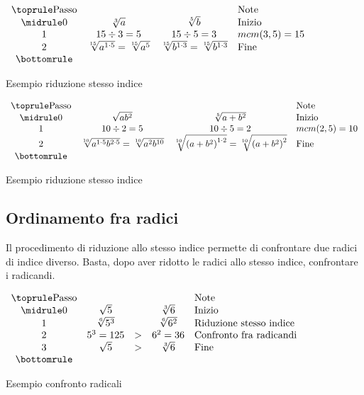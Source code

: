 \begin{table}[H]
\centering
$
\begin{array}{cccl}
\toprule
\text{Passo} &  &  & \text{Note} \\  
\midrule
0 & \sqrt[3]{a} &\sqrt[5]{b}  &\text{Inizio} \\ 
1 & 15\div 3=5 &15\div 5=3  & mcm(3,5)=15 \\  
2 &\sqrt[15]{a^{1\cdot5}}=\sqrt[15]{a^{5}}  &\sqrt[15]{b^{1\cdot3}}=\sqrt[15]{b^{1\cdot3}}  &\text{Fine} \\
\bottomrule	
\end{array} 
$
\label{tab:Es1Ridstessoindice}
\caption{Esempio riduzione stesso indice}
\end{table}
\begin{table}[H]
\centering
$
\begin{array}{cccl}
\toprule
\text{Passo} &  &  &\text{Note} \\  
\midrule
0 & \sqrt{ab^2} &\sqrt[5]{a+b^2}  &\text{Inizio} \\ 
1 & 10\div 2=5 &10\div 5=2  & mcm(2,5)=10 \\  
2 &\sqrt[10]{a^{1\cdot 5}b^{2\cdot 5}}=\sqrt[10]{a^{2}b^{10}}& \sqrt[10]{\left( a+b^2\right)^{1\cdot 2} }=\sqrt[10]{\left( a+b^2\right)^{2} }   &\text{Fine} \\
\bottomrule	
\end{array} 
$
\label{tab:Es1Ridstessoindice2}
\caption{Esempio riduzione stesso indice}
\end{table}
\subsection{Ordinamento fra radici}
\label{sec:OrdinamentoFraRadici}
Il procedimento di riduzione allo stesso indice permette di confrontare due radici di indice diverso. Basta, dopo aver ridotto le radici allo stesso indice, confrontare i radicandi.
\begin{table}[H]
\centering
$
\begin{array}{ccccl}
\toprule
\text{Passo} &  &  &  &\text{Note} \\ 
\midrule
0 & \sqrt{5} &  &\sqrt[3]{6} & \text{Inizio} \\ 
1 & \sqrt[6]{5^3} &  &\sqrt[6]{6^2}  &\text{Riduzione stesso indice} \\ 
2 & 5^3=125 & > & 6^2=36 & \text{Confronto fra radicandi} \\ 
3 & \sqrt{5} & > & \sqrt[3]{6} & \text{Fine} \\
\bottomrule	
\end{array} 
$
\label{tab:confrontoradicali}
\caption{Esempio confronto radicali}
\end{table}

